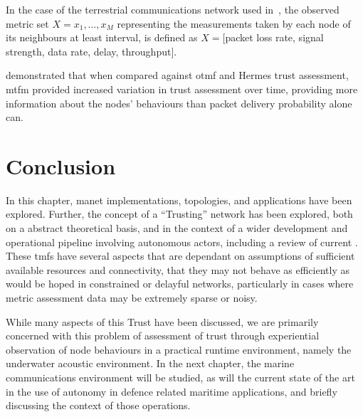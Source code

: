 In the case of the terrestrial communications network used in~\cite{Guo11}, the observed metric set $X = {x_1,\dots,x_M}$ representing the measurements taken by each node of its neighbours at least interval, is defined as $X=[$packet loss rate, signal strength, data rate, delay, throughput$]$.

\citet{Guo11} demonstrated that when compared against \gls{otmf} and Hermes trust assessment, \gls{mtfm} provided increased variation in trust assessment over time, providing more information about the nodes' behaviours than packet delivery probability alone can.

\section{Conclusion}
In this chapter, \gls{manet} implementations, topologies, and applications have been explored. 
Further, the concept of a ``Trusting'' network has been explored, both on a abstract theoretical basis, and in the context of a wider development and operational pipeline involving autonomous actors, including a review of current .
These \glspl{tmf} have several aspects that are dependant on assumptions of sufficient available resources and connectivity, that they may not behave as efficiently as would be hoped in constrained or delayful networks, particularly in cases where metric assessment data may be extremely sparse or noisy.

While many aspects of this Trust have been discussed, we are primarily concerned with this problem of assessment of trust through experiential observation of node behaviours in a practical runtime environment, namely the underwater acoustic environment.
In the next chapter, the marine communications environment will be studied, as will the current state of the art in the use of autonomy in defence related maritime applications, and briefly discussing the context of those operations.
